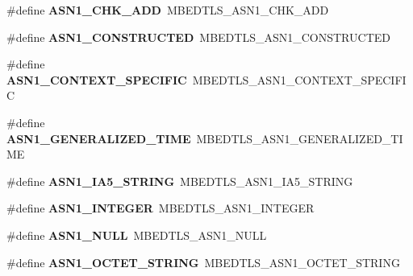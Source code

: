 \begin{DoxyCompactItemize}
\item 
\mbox{\label{compat-1_83_8h_a59a0e7232df596386a3662126e055f28}} 
\#define {\bfseries A\+S\+N1\+\_\+\+C\+H\+K\+\_\+\+A\+DD}~M\+B\+E\+D\+T\+L\+S\+\_\+\+A\+S\+N1\+\_\+\+C\+H\+K\+\_\+\+A\+DD
\item 
\mbox{\label{compat-1_83_8h_a799d7b17a9532e1dadc8355f04477e27}} 
\#define {\bfseries A\+S\+N1\+\_\+\+C\+O\+N\+S\+T\+R\+U\+C\+T\+ED}~M\+B\+E\+D\+T\+L\+S\+\_\+\+A\+S\+N1\+\_\+\+C\+O\+N\+S\+T\+R\+U\+C\+T\+ED
\item 
\mbox{\label{compat-1_83_8h_ab1f89bc6e469d46d5293f724d317d1d7}} 
\#define {\bfseries A\+S\+N1\+\_\+\+C\+O\+N\+T\+E\+X\+T\+\_\+\+S\+P\+E\+C\+I\+F\+IC}~M\+B\+E\+D\+T\+L\+S\+\_\+\+A\+S\+N1\+\_\+\+C\+O\+N\+T\+E\+X\+T\+\_\+\+S\+P\+E\+C\+I\+F\+IC
\item 
\mbox{\label{compat-1_83_8h_ab7a08388517b5d807fb6bc2ed0325b90}} 
\#define {\bfseries A\+S\+N1\+\_\+\+G\+E\+N\+E\+R\+A\+L\+I\+Z\+E\+D\+\_\+\+T\+I\+ME}~M\+B\+E\+D\+T\+L\+S\+\_\+\+A\+S\+N1\+\_\+\+G\+E\+N\+E\+R\+A\+L\+I\+Z\+E\+D\+\_\+\+T\+I\+ME
\item 
\mbox{\label{compat-1_83_8h_a45d8160d9158c5e040db66bb79fc8f18}} 
\#define {\bfseries A\+S\+N1\+\_\+\+I\+A5\+\_\+\+S\+T\+R\+I\+NG}~M\+B\+E\+D\+T\+L\+S\+\_\+\+A\+S\+N1\+\_\+\+I\+A5\+\_\+\+S\+T\+R\+I\+NG
\item 
\mbox{\label{compat-1_83_8h_a0d3b979ef2ca9618ec1899fd0e14d8ec}} 
\#define {\bfseries A\+S\+N1\+\_\+\+I\+N\+T\+E\+G\+ER}~M\+B\+E\+D\+T\+L\+S\+\_\+\+A\+S\+N1\+\_\+\+I\+N\+T\+E\+G\+ER
\item 
\mbox{\label{compat-1_83_8h_a381db5db1873cb0b03744322cd9bc19c}} 
\#define {\bfseries A\+S\+N1\+\_\+\+N\+U\+LL}~M\+B\+E\+D\+T\+L\+S\+\_\+\+A\+S\+N1\+\_\+\+N\+U\+LL
\item 
\mbox{\label{compat-1_83_8h_ae251e2c2d40228a89468f3f939a18585}} 
\#define {\bfseries A\+S\+N1\+\_\+\+O\+C\+T\+E\+T\+\_\+\+S\+T\+R\+I\+NG}~M\+B\+E\+D\+T\+L\+S\+\_\+\+A\+S\+N1\+\_\+\+O\+C\+T\+E\+T\+\_\+\+S\+T\+R\+I\+NG
\item 
\mbox{\label{compat-1_83_8h_a3fef844d0ea67080b66b3a4d5f0a9ec8}} 

\end{DoxyCompactItemize}
